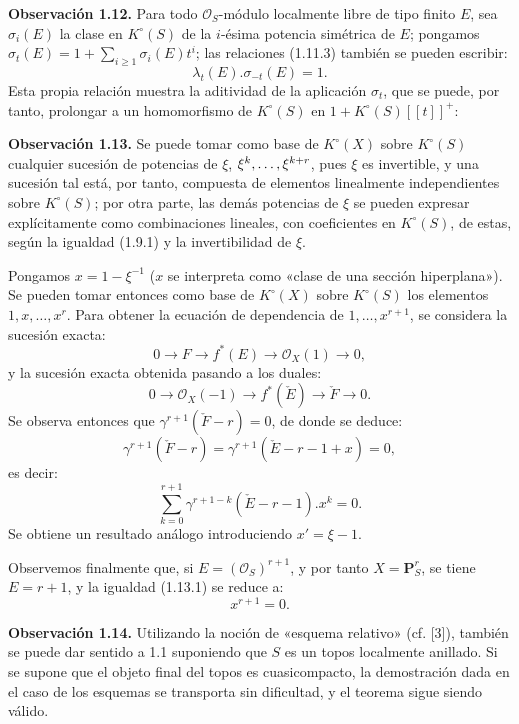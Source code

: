 \textbf{Observación 1.12.} Para todo \(\mathcal O_S\)-módulo localmente libre de tipo finito \(E\), sea \(\sigma_i(E)\) la clase en \(K^\circ(S)\) de la \(i\)-ésima potencia simétrica de \(E\); pongamos \(\sigma_t(E)=1+\sum_{i\geq1}\sigma_i(E)t^i\); las relaciones (1.11.3) también se pueden escribir:
\begin{equation}\tag{1.12.1}
  \lambda_t(E).\sigma_{-t}(E)=1.
\end{equation}
Esta propia relación muestra la aditividad de la aplicación \(\sigma_t\), que se puede, por tanto, prolongar a un homomorfismo de \(K^\circ(S)\) en \(1+K^\circ(S)[[t]]^+\):

\textbf{Observación 1.13.} Se puede tomar como base de \(K^\circ(X)\) sobre \(K^\circ(S)\) cualquier sucesión de potencias de \(\xi\), \(\xi^k,\ldots,\xi^{\sisi{k+r+1}{k+r}}\), pues \(\xi\) es invertible, y una sucesión tal está, por tanto, compuesta de elementos linealmente independientes sobre \(K^\circ(S)\); por otra parte, las demás potencias de \(\xi\) se pueden expresar explícitamente como combinaciones lineales, con coeficientes en \(K^\circ(S)\), de estas, según la igualdad (1.9.1) y la invertibilidad de \(\xi\).

Pongamos \(x=1-\xi^{-1}\) (\(x\) se interpreta como «clase de una sección hiperplana»). Se pueden tomar entonces como base de \(K^\circ(X)\) sobre \(K^\circ(S)\) los elementos \(1,x,\ldots,x^r\). Para obtener la ecuación de dependencia de \(1,\ldots,x^{r+1}\), se considera la sucesión exacta:
\[
  0\longrightarrow F\longrightarrow f^*(E)\longrightarrow \mathcal O_X(1)\longrightarrow0,
\]
y la sucesión exacta obtenida pasando a los duales:
\[
  0\longrightarrow \mathcal O_X(-1)\longrightarrow f^*(\check E)\longrightarrow \check F\longrightarrow0.
\]
Se observa entonces que \(\gamma^{r+1}(\check F-r)=0\), de donde se deduce:
\[
  \gamma^{r+1}(\check F-r)=\gamma^{r+1}(\check E-r-1+x)=0,
\]
es decir:
\begin{equation}\tag{1.13.1}
  \sum_{k=0}^{r+1}\gamma^{r+1-k}(\check E-r-1).x^k=0.
\end{equation}
Se obtiene un resultado análogo introduciendo \(x'=\xi-1\).

Observemos finalmente que, si \(E=(\mathcal O_S)^{r+1}\), y por tanto \(X=\mathbf P_S^r\), se tiene \(E=r+1\), y la igualdad (1.13.1) se reduce a:
\begin{equation}\tag{1.13.2}
  x^{r+1}=0.
\end{equation}

\textbf{Observación 1.14.} Utilizando la noción de «esquema relativo» (cf. [3]), también se puede dar sentido a 1.1 suponiendo que \(S\) es un topos localmente anillado. Si se supone que el objeto final del topos es cuasicompacto, la demostración dada en el caso de los esquemas se transporta sin dificultad, y el teorema sigue siendo válido.

